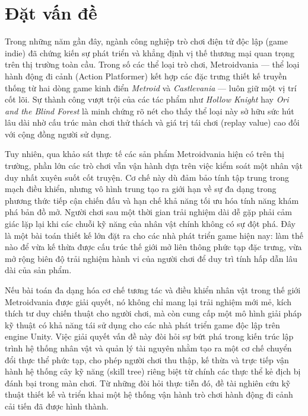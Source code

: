 \documentclass[../DoAn.tex]{subfiles}
\begin{document}
\section{Đặt vấn đề}
\label{section:1.1}

Trong những năm gần đây, ngành công nghiệp trò chơi điện tử độc lập (game indie) đã chứng kiến sự phát triển và khẳng định vị thế thương mại quan trọng trên thị trường toàn cầu. Trong số các thể loại trò chơi, Metroidvania — thể loại hành động đi cảnh (Action Platformer) kết hợp các đặc trưng thiết kế truyền thống từ hai dòng game kinh điển \textit{Metroid} và \textit{Castlevania} — luôn giữ một vị trí cốt lõi. Sự thành công vượt trội của các tác phẩm như \textit{Hollow Knight} hay \textit{Ori and the Blind Forest} là minh chứng rõ nét cho thấy thể loại này sở hữu sức hút lâu dài nhờ cấu trúc màn chơi thử thách và giá trị tái chơi (replay value) cao đối với cộng đồng người sử dụng.

Tuy nhiên, qua khảo sát thực tế các sản phẩm Metroidvania hiện có trên thị trường, phần lớn các trò chơi vẫn vận hành dựa trên việc kiểm soát một nhân vật duy nhất xuyên suốt cốt truyện. Cơ chế này dù đảm bảo tính tập trung trong mạch điều khiển, nhưng vô hình trung tạo ra giới hạn về sự đa dạng trong phương thức tiếp cận chiến đấu và hạn chế khả năng tối ưu hóa tính năng khám phá bản đồ mở. Người chơi sau một thời gian trải nghiệm dài dễ gặp phải cảm giác lặp lại khi các chuỗi kỹ năng của nhân vật chính không có sự đột phá. Đây là một bài toán thiết kế lớn đặt ra cho các nhà phát triển game hiện nay: làm thế nào để vừa kế thừa được cấu trúc thế giới mở liên thông phức tạp đặc trưng, vừa mở rộng biên độ trải nghiệm hành vi của người chơi để duy trì tính hấp dẫn lâu dài của sản phẩm.

Nếu bài toán đa dạng hóa cơ chế tương tác và điều khiển nhân vật trong thế giới Metroidvania được giải quyết, nó không chỉ mang lại trải nghiệm mới mẻ, kích thích tư duy chiến thuật cho người chơi, mà còn cung cấp một mô hình giải pháp kỹ thuật có khả năng tái sử dụng cho các nhà phát triển game độc lập trên engine Unity. Việc giải quyết vấn đề này đòi hỏi sự bứt phá trong kiến trúc lập trình hệ thống nhân vật và quản lý tài nguyên nhằm tạo ra một cơ chế chuyển đổi thực thể phức tạp, cho phép người chơi thu thập, kế thừa và trực tiếp vận hành hệ thống cây kỹ năng (skill tree) riêng biệt từ chính các thực thể kẻ địch bị đánh bại trong màn chơi. Từ những đòi hỏi thực tiễn đó, đề tài nghiên cứu kỹ thuật thiết kế và triển khai một hệ thống vận hành trò chơi hành động đi cảnh cải tiến đã được hình thành.
\end{document}
